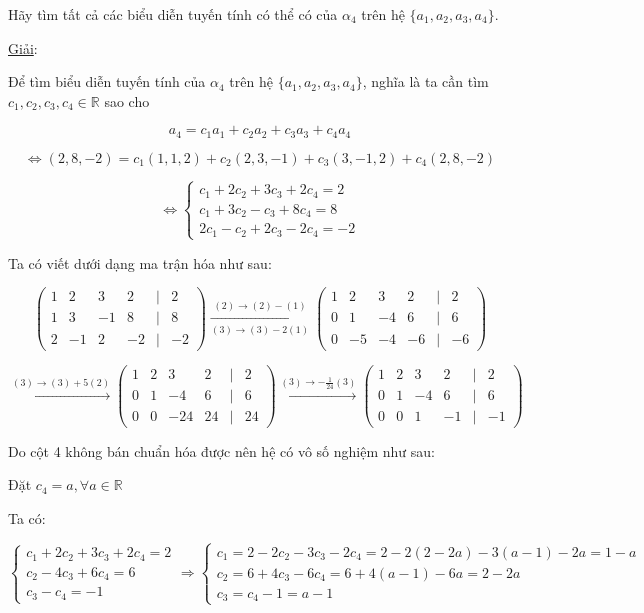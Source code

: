 \documentclass[12pt,a4paper]{article}
\begin{document}
Hãy tìm tất cả các biểu diễn tuyến tính có thể có của
$\alpha_4$ trên hệ
$\{a_1, a_2, a_3, a_4\}$.

\ul{Giải}:

Để tìm biểu diễn tuyến tính của
$\alpha_4$ trên hệ
$\{a_1, a_2, a_3, a_4\}$, nghĩa là ta
cần tìm $c_1, c_2, c_3, c_4 \in \mathbb{R}$ sao
cho

\[ a_4 = c_1a_1 + c_2a_2 + c_3a_3 + c_4a_4 \]

\[ \Leftrightarrow (2, 8, -2) = c_1(1, 1, 2) + c_2(2, 3, -1) + c_3(3, -1, 2) + c_4(2, 8, -2) \]

\[ \Leftrightarrow \begin{cases} c_1 + 2c_2 + 3c_3 + 2c_4 = 2 \\ c_1 + 3c_2 - c_3 + 8c_4 = 8 \\ 2c_1 - c_2 + 2c_3 - 2c_4 = -2 \end{cases} \]

Ta có viết dưới dạng ma trận hóa như sau:

\[ \begin{pmatrix} 1 & 2 & 3 & 2 & | & 2 \\ 1 & 3 & -1 & 8 & | & 8 \\ 2 & -1 & 2 & -2 & | & -2 \end{pmatrix} \xrightarrow[(3) \rightarrow (3) - 2(1)]{(2) \rightarrow (2) - (1)} \begin{pmatrix} 1 & 2 & 3 & 2 & | & 2 \\ 0 & 1 & -4 & 6 & | & 6 \\ 0 & -5 & -4 & -6 & | & -6 \end{pmatrix} \]

\[ \xrightarrow{(3) \rightarrow (3) + 5(2)} \begin{pmatrix} 1 & 2 & 3 & 2 & | & 2 \\ 0 & 1 & -4 & 6 & | & 6 \\ 0 & 0 & -24 & 24 & | & 24 \end{pmatrix} \xrightarrow{(3) \rightarrow -\frac{1}{24}(3)} \begin{pmatrix} 1 & 2 & 3 & 2 & | & 2 \\ 0 & 1 & -4 & 6 & | & 6 \\ 0 & 0 & 1 & -1 & | & -1 \end{pmatrix} \]

Do cột 4 không bán chuẩn hóa được nên hệ có vô số nghiệm như sau:

Đặt $c_4 = a, \forall a \in \mathbb{R}$

Ta có:

\[ \begin{cases} c_1 + 2c_2 + 3c_3 + 2c_4 = 2 \\ c_2 - 4c_3 + 6c_4 = 6 \\ c_3 - c_4 = -1 \end{cases} \Rightarrow \begin{cases} c_1 = 2 - 2c_2 - 3c_3 - 2c_4 = 2 - 2(2 - 2a) - 3(a - 1) - 2a = 1 - a \\ c_2 = 6 + 4c_3 - 6c_4 = 6 + 4(a - 1) - 6a = 2 - 2a \\ c_3 = c_4 - 1 = a - 1 \end{cases} \]
\end{document}
